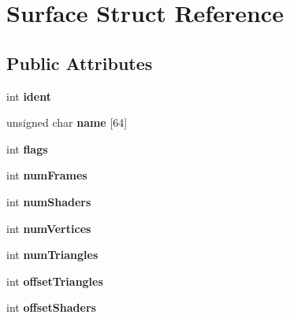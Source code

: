 \hypertarget{struct_surface}{\section{Surface Struct Reference}
\label{struct_surface}
}
\subsection*{Public Attributes}
\begin{DoxyCompactItemize}
\item 
\hypertarget{struct_surface_a6261d0230781699b085b6f816338c0bc}{int {\bfseries ident}}\label{struct_surface_a6261d0230781699b085b6f816338c0bc}

\item 
\hypertarget{struct_surface_a81422edba521cbd6ac1632dc5b9bc2cf}{unsigned char {\bfseries name} \mbox{[}64\mbox{]}}\label{struct_surface_a81422edba521cbd6ac1632dc5b9bc2cf}

\item 
\hypertarget{struct_surface_aef661c596717b281059c46335af49d25}{int {\bfseries flags}}\label{struct_surface_aef661c596717b281059c46335af49d25}

\item 
\hypertarget{struct_surface_acdb580f43ae4fe6ae76811b7ce4e7c34}{int {\bfseries num\-Frames}}\label{struct_surface_acdb580f43ae4fe6ae76811b7ce4e7c34}

\item 
\hypertarget{struct_surface_a8107bc5bbe76e235d012c7f9cc03c466}{int {\bfseries num\-Shaders}}\label{struct_surface_a8107bc5bbe76e235d012c7f9cc03c466}

\item 
\hypertarget{struct_surface_a480d8da7460a173f7cdfd4de93f714e5}{int {\bfseries num\-Vertices}}\label{struct_surface_a480d8da7460a173f7cdfd4de93f714e5}

\item 
\hypertarget{struct_surface_a62864d7528df6a3d490de5abd94589b7}{int {\bfseries num\-Triangles}}\label{struct_surface_a62864d7528df6a3d490de5abd94589b7}

\item 
\hypertarget{struct_surface_a0979767d0b2bae4b6a6c6ee14c910c15}{int {\bfseries offset\-Triangles}}\label{struct_surface_a0979767d0b2bae4b6a6c6ee14c910c15}

\item 
\hypertarget{struct_surface_a0085e0c3f74ab780e348ec6e334ce53a}{int {\bfseries offset\-Shaders}}\label{struct_surface_a0085e0c3f74ab780e348ec6e334ce53a}


\end{DoxyCompactItemize}
